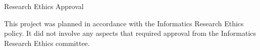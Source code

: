 \documentclass[logo,bsc,singlespacing,parskip]{infthesis}
\begin{document}
\begin{preliminary}
{%



}

\maketitle

\newenvironment{ethics}
   {\begin{frontenv}{Research Ethics Approval}{\LARGE}}
   {\end{frontenv}\newpage}

\begin{ethics}

This project was planned in accordance with the Informatics Research
Ethics policy. It did not involve any aspects that required approval
from the Informatics Research Ethics committee.

\standarddeclaration
\end{ethics}


\begin{acknowledgements}




\end{acknowledgements}


\tableofcontents
\end{preliminary}
\end{document}
